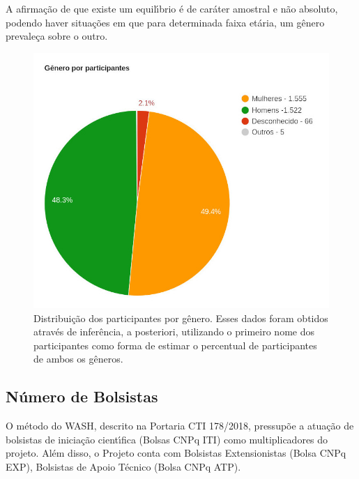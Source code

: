 \documentclass[
12pt,		%
openright,	%
twoside,  %
a4paper,			%
chapter=TITLE,		%
english,			%
french,				%
spanish,			%
brazil				%
]{USPSC-classe/USPSC_RedarTex}
\begin{document}
A afirma\c{c}\~ao de que existe um equil\'{\i}brio \'e de car\'ater amostral e n\~ao absoluto, podendo haver situa\c{c}\~oes em que para determinada faixa et\'aria, um g\^enero prevale\c{c}a sobre o outro.










\captionsetup{format=plain}
\begin{figure}[max size={\textwidth}{\textheight}]

\centering


\begin{minipage}[b]{0.4\linewidth}
        \centering
                \includegraphics[width=1.0\linewidth]{../../imagens/genero-todos-crop.jpeg}
                \caption{Distribui\c{c}\~ao dos participantes por g\^enero. Esses dados foram obtidos atrav\'es de infer\^encia, a posteriori, utilizando o primeiro nome dos participantes como forma de estimar o percentual de participantes de ambos os g\^eneros.}
                \label{ef11d820efb73d78fb64eb6bdd03853471a8e89f}
\end{minipage}%
\hspace{0.5cm}
\end{figure}



\subsection[N\'umero de Bolsistas]{N\'umero de Bolsistas}\label{N\'umero de Bolsistas}
O m\'etodo do WASH, descrito na Portaria CTI 178/2018, pressup\~oe a atua\c{c}\~ao de bolsistas de inicia\c{c}\~ao cient\'{\i}fica (Bolsas CNPq ITI) como multiplicadores do projeto. Al\'em disso, o Projeto conta com Bolsistas Extensionistas (Bolsa CNPq EXP), Bolsistas de Apoio T\'ecnico (Bolsa CNPq ATP).
\end{document}
